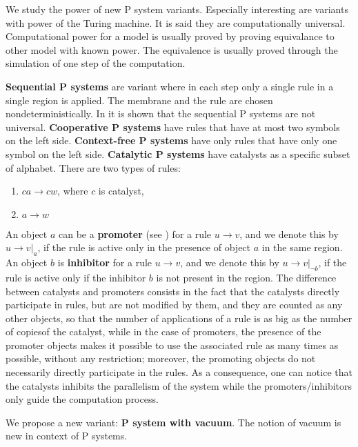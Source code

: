\documentclass[a4paper,10pt]{article}
\begin{document}
We study the power of new P system variants. Especially interesting are variants with power of the Turing machine. It is said they are computationally universal. Computational power for a model is usually proved by proving equivalance to other model with known power. The equivalence is usually proved through the simulation of one step of the computation.

{\bf Sequential P systems} are variant where in each step only a single rule in a single region is applied. The membrane and the rule are chosen nondeterministically. In \cite{Ibarra:2005:SPS:2111772.2111880} it is shown that the sequential P systems are not universal.
{\bf Cooperative P systems} have rules that have at most two symbols on the left side.
{\bf Context-free P systems} have only rules that have only one symbol on the left side.
{\bf Catalytic P systems} have catalysts as a specific subset of alphabet. There are two types of rules:

\begin{enumerate}
	\item $ca\rightarrow cw$, where $c$ is catalyst,
	\item $a\rightarrow w$
\end{enumerate}

An object $a$ can be a {\bf promoter} (see \cite{Ionescu:jucs_10_5:on_p_systems_with}) for a rule $u\rightarrow v$, and we denote this by $u\rightarrow v|_a$, if the rule is active only in the presence of object $a$ in the same region. An object $b$ is {\bf inhibitor} for a rule $u\rightarrow v$, and we denote this by $u\rightarrow v|_{\neg b}$, if the rule is active only if the inhibitor $b$ is not present in the region.
The difference between catalysts and promoters consists in the fact that the catalysts directly participate in rules, but are not modified by them, and they are counted as any other objects, so that the number of applications of a rule is as big as the number of copiesof the catalyst, while in the case of promoters, the presence of the promoter objects makes it possible to use the associated rule as many times as possible, without any restriction; moreover, the promoting objects do not necessarily directly participate in the rules. As a consequence, one can notice that the catalysts inhibits the parallelism of the system while the promoters/inhibitors only guide the computation process.

\vspace*{\baselineskip}

We propose a new variant: {\bf P system with vacuum}. The notion of vacuum is new in context of P systems.
\end{document}
